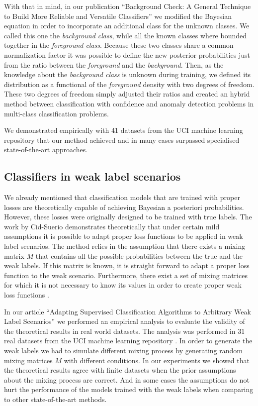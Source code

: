 \documentclass[a4paper, 12pt]{article}
\begin{document}
With that in mind, in our publication ``Background Check: A General Technique to Build More Reliable and Versatile Classifiers''  \cite{perello2016} we modified the Bayesian equation in order to incorporate an additional class for the unknown classes. We called this one the \emph{background class}, while all the known classes where bounded together in the \emph{foreground class}. 
Because these two classes share a common normalization factor it was possible to define the new posterior probabilities just from the ratio between the \emph{foreground} and the \emph{background}.
Then, as the knowledge about the \emph{background class} is unknown during training, we defined its distribution as a functional of the \emph{foreground} density with two degrees of freedom.
These two degrees of freedom simply adjusted their ratios and created an hybrid method between classification with confidence and anomaly detection problems in multi-class classification problems.

We demonstrated empirically with 41 datasets from the UCI machine learning repository \cite{Lichman:2013} that our method achieved and in many cases surpassed specialised state-of-the-art approaches. 

\subsection{Classifiers in weak label scenarios}
\label{sec:cur:weak}

We already mentioned that classification models that are trained with proper losses are theoretically capable of achieving Bayesian a posteriori probabilities.
However, these losses were originally designed to be trained with true labels.
The work by Cid-Suerio \cite{Cid-sueiro2012} demonstrates theoretically that under certain mild assumptions it is possible to adapt proper loss functions to be applied in weak label scenarios.
The method relies in the assumption that there exists a mixing matrix $M$ that contains all the possible probabilities between the true and the weak labels.
If this matrix is known, it is straight forward to adapt a proper loss function to the weak scenario.
Furthermore, there exist a set of mixing matrices for which it is not necessary to know its values in order to create proper weak loss functions \cite{Cid-Sueiro2014}.

In our article ``Adapting Supervised Classification Algorithms to Arbitrary Weak Label Scenarios'' \cite{perello2017} we performed an empirical analysis to evaluate the validity of the theoretical results in real world datasets.
The analysis was performed in 31 real datasets from the UCI machine learning repository \cite{Lichman:2013}.
In order to generate the weak labels we had to simulate different mixing process by generating random mixing matrices $M$ with different conditions.
In our experiments we showed that the theoretical results agree with finite datasets when the prior assumptions about the mixing process are correct.
And in some cases the assumptions do not hurt the performance of the models trained with the weak labels when comparing to other state-of-the-art methods.
\end{document}
